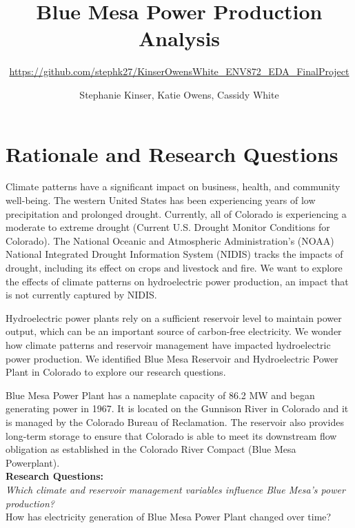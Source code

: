 \documentclass[
  12pt,
]{article}
\title{Blue Mesa Power Production Analysis}
\subtitle{\url{https://github.com/stephk27/KinserOwensWhite_ENV872_EDA_FinalProject}}
\author{Stephanie Kinser, Katie Owens, Cassidy White}
\date{}
\begin{document}
\maketitle

\newpage
\tableofcontents 
\newpage
\listoftables 
\newpage
\listoffigures 
\newpage

\hypertarget{rationale-and-research-questions}{%
\section{Rationale and Research
Questions}\label{rationale-and-research-questions}}

Climate patterns have a significant impact on business, health, and
community well-being. The western United States has been experiencing
years of low precipitation and prolonged drought. Currently, all of
Colorado is experiencing a moderate to extreme drought (Current U.S.
Drought Monitor Conditions for Colorado). The National Oceanic and
Atmospheric Administration's (NOAA) National Integrated Drought
Information System (NIDIS) tracks the impacts of drought, including its
effect on crops and livestock and fire. We want to explore the effects
of climate patterns on hydroelectric power production, an impact that is
not currently captured by NIDIS.

Hydroelectric power plants rely on a sufficient reservoir level to
maintain power output, which can be an important source of carbon-free
electricity. We wonder how climate patterns and reservoir management
have impacted hydroelectric power production. We identified Blue Mesa
Reservoir and Hydroelectric Power Plant in Colorado to explore our
research questions.

Blue Mesa Power Plant has a nameplate capacity of 86.2 MW and began
generating power in 1967. It is located on the Gunnison River in
Colorado and it is managed by the Colorado Bureau of Reclamation. The
reservoir also provides long-term storage to ensure that Colorado is
able to meet its downstream flow obligation as established in the
Colorado River Compact (Blue Mesa Powerplant).\\

\textbf{Research Questions:}\\

\emph{Which climate and reservoir management variables influence Blue
Mesa's power production?\\
}How has electricity generation of Blue Mesa Power Plant changed over
time?
\end{document}
